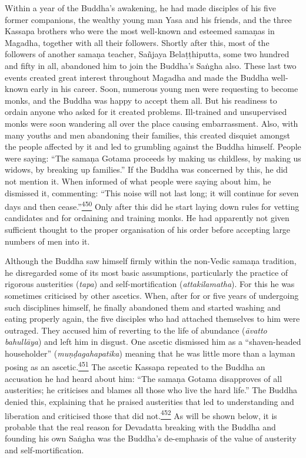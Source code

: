 Within a year of the Buddha's awakening, he had made disciples of his
five former companions, the wealthy young man Yasa and his friends, and
the three Kassapa brothers who were the most well-known and esteemed
samaṇas in Magadha, together with all their followers. Shortly after
this, most of the followers of another samaṇa teacher, Sañjaya
Belaṭṭhiputta, some two hundred and fifty in all, abandoned him to join
the Buddha's Saṅgha also. These last two events created great interest
throughout Magadha and made the Buddha well-known early in his career.
Soon, numerous young men were requesting to become monks, and the Buddha
was happy to accept them all. But his readiness to ordain anyone who
asked for it created problems. Ill-trained and unsupervised monks were
soon wandering all over the place causing embarrassment. Also, with many
youths and men abandoning their families, this created disquiet amongst
the people affected by it and led to grumbling against the Buddha
himself. People were saying: ``The samaṇa Gotama proceeds by making us
childless, by making us widows, by breaking up families.'' If the Buddha
was concerned by this, he did not mention it. When informed of what
people were saying about him, he dismissed it, commenting: ``This noise
will not last long; it will continue for seven days and then
cease.''\label{footprints_split_013.html_fnref450}\hyperref[footprints_split_025.htmlux5cux23fn450]{\textsuperscript{450}}
Only after this did he start laying down rules for vetting candidates
and for ordaining and training monks. He had apparently not given
sufficient thought to the proper organisation of his order before
accepting large numbers of men into it.

Although the Buddha saw himself firmly within the non-Vedic samaṇa
tradition, he disregarded some of its most basic assumptions,
particularly the practice of rigorous austerities (\emph{tapa}) and
self-mortification (\emph{attakilamatha}). For this he was sometimes
criticised by other ascetics. When, after for or five years of
undergoing such disciplines himself, he finally abandoned them and
started washing and eating properly again, the five disciples who had
attached themselves to him were outraged. They accused him of reverting
to the life of abundance (\emph{āvatto bahullāya}) and left him in
disgust. One ascetic dismissed him as a ``shaven-headed householder''
(\emph{muṇḍagahapatika}) meaning that he was little more than a layman
posing as an
ascetic.\label{footprints_split_013.html_fnref451}\hyperref[footprints_split_025.htmlux5cux23fn451]{\textsuperscript{451}}
The ascetic Kassapa repeated to the Buddha an accusation he had heard
about him: ``The samaṇa Gotama disapproves of all austerities; he
criticises and blames all those who live the hard life.'' The Buddha
denied this, explaining that he praised austerities that led to
understanding and liberation and criticised those that did
not.\label{footprints_split_013.html_fnref452}\hyperref[footprints_split_025.htmlux5cux23fn452]{\textsuperscript{452}}
As will be shown below, it is probable that the real reason for
Devadatta breaking with the Buddha and founding his own Saṅgha was the
Buddha's de-emphasis of the value of austerity and self-mortification.

